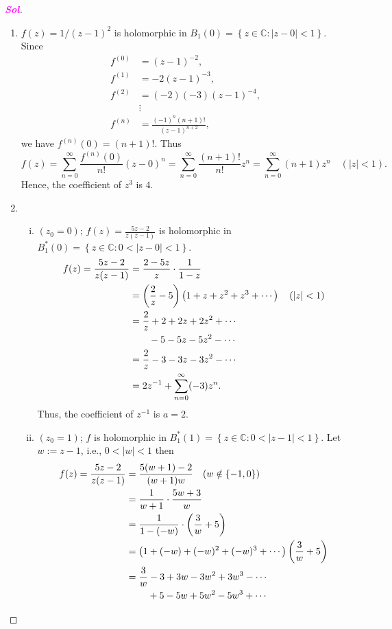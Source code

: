 \documentclass{article}
\newcommand{\ie}{\textnormal{i.e.}}
\theoremstyle{definition}
\newcommand{\set}[1]{\left\{#1\right\}}
\newcommand{\C}{\mathbb{C}}
\newcommand{\of}[1]{\left( #1 \right)}
\newcommand{\abs}[1]{\left\lvert #1 \right\rvert}
\newcommand{\sol}{\textcolor{magenta}{\bf Sol}}
\begin{document}
	\begin{proof}[\sol]
		\begin{enumerate}[(1)]
			\item $f(z)=1/(z-1)^2$ is holomorphic in $B_1(0)=\set{z\in\C:\abs{z-0}<1}$. Since \begin{align*}
			f^{(0)}&=(z-1)^{-2},\\
			f^{(1)}&=-2(z-1)^{-3},\\
			f^{(2)}&=(-2)(-3)(z-1)^{-4},\\
			&\vdots\\
			f^{(n)}&=\frac{(-1)^n(n+1)!}{(z-1)^{n+2}},
			\end{align*} we have $f^{(n)}(0)=(n+1)!$. Thus \[
			f(z)=\sum_{n=0}^{\infty}\frac{f^{(n)}(0)}{n!}(z-0)^n=\sum_{n=0}^\infty \frac{(n+1)!}{n!}z^n=\sum_{n=0}^\infty (n+1)z^n\quad(\abs{z}<1).
			\] Hence, the coefficient of $z^3$ is $4$.
			\vspace{4pt}
			\item \begin{enumerate}[(i)]
				\item $(z_0=0)$; $\displaystyle f(z)=\frac{5z-2}{z(z-1)}$ is holomorphic in $B_1^*(0)=\set{z\in\C:0<\abs{z-0}<1}$. \begin{align*}
				f(z)=\frac{5z-2}{z(z-1)}&=\frac{2-5z}{z}\cdot\frac{1}{1-z}\\
				&=\of{\frac{2}{z}-5}\of{1+z+z^2+z^3+\cdots}\quad(\abs{z}<1)\\
				&=\frac{2}{z}+2+2z+2z^2+\cdots\\
				&\hspace{7mm}-5-5z-5z^2-\cdots\\
				&=\frac{2}{z}-3-3z-3z^2-\cdots\\
				&=2z^{-1}+\sum_{n=0}^{\infty}(-3)z^n.
				\end{align*}
				Thus, the coefficient of $z^{-1}$ is $a=2$.
				\item $(z_0=1)$; $f$ is holomorphic in $B_1^*(1)=\set{z\in\C:0<\abs{z-1}<1}$. Let $w:=z-1$, \ie, $0<\abs{w}<1$ then \begin{align*}
					f(z)=\frac{5z-2}{z(z-1)}&=\frac{5(w+1)-2}{(w+1)w}\quad(w\notin\set{-1,0})\\
					&=\frac{1}{w+1}\cdot\frac{5w+3}{w}\\
					&=\frac{1}{1-(-w)}\cdot\of{\frac{3}{w}+5}\\
					&=\of{1+(-w)+(-w)^2+(-w)^3+\cdots}\of{\frac{3}{w}+5}\\
					&=\frac{3}{w}-3+3w-3w^2+3w^3-\cdots\\
					&\hspace{8mm}+5-5w+5w^2-5w^3+\cdots\\

\end{align*}
\end{enumerate}
\end{enumerate}
\end{proof}
\end{document}
